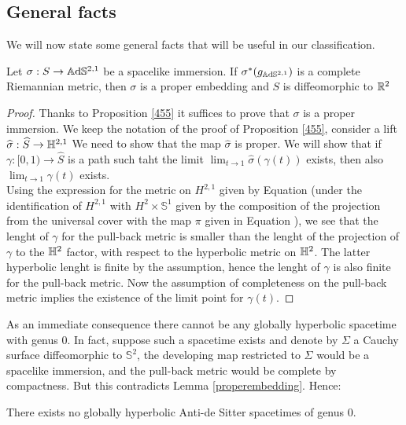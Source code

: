 \subsection{General facts} We will now state some general facts that will be useful in our classification.

\begin{lemma}\label{properembedding}
    Let $\sigma:S\to\mathbb{A}\mathrm{d}\mathbb{S}^{2,1}$ be a spacelike immersion. If $\sigma^*(g_{\mathbb{A}\mathrm{d}\mathbb{S}^{2,1}})$ is a complete Riemannian metric, then $\sigma$ is a proper embedding and $S$ is diffeomorphic to $\mathbb{R}^2$
\end{lemma}
\begin{proof}
    Thanks to Proposition \ref{455} it suffices to prove that $\sigma$ is a proper immersion. We keep the notation of the proof of Proposition \ref{455}, consider a lift $\widehat{\sigma}:\widehat{S}\to\mathbb{H}^{2,1}$ We need to show that the map $\widehat{\sigma}$ is proper. We will show that if $\gamma:[0,1)\to\widehat{S}$ is a path such taht the limit $\lim_{t\to 1}\widehat{\sigma}(\gamma(t))$ exists, then also $\lim_{t \to 1}\gamma(t)$ exists. \\
    Using the expression for the metric on $H^{2,1}$ given by Equation  (under the identification of $H^{2,1}$ with $H^{2}\times\mathbb{S}^{1}$ given by the composition of the projection from the universal cover with the map $\pi$ given in Equation ), we see that the lenght of $\gamma$ for the pull-back metric is smaller than the lenght of the projection of $\gamma$ to the $\mathbb{H}^2$ factor, with respect to the hyperbolic metric on $\mathbb{H}^2$. The latter hyperbolic lenght is finite by the assumption, hence the lenght of $\gamma$ is also finite for the pull-back metric. Now the assumption of completeness on the pull-back metric implies the existence of the limit point for $\gamma(t)$.
\end{proof}

As an immediate consequence there cannot be any globally hyperbolic spacetime with genus $0$. In fact, suppose such a spacetime exists and denote by $\Sigma$ a Cauchy surface diffeomorphic to $\mathbb{S}^2$, the developing map restricted to $\Sigma$ would be a spacelike immersion, and the pull-back metric would be complete by compactness. But this contradicts Lemma \ref{properembedding}. Hence: 

\begin{corollary}
    There exists no globally hyperbolic Anti-de Sitter spacetimes of genus 0. 
\end{corollary}

